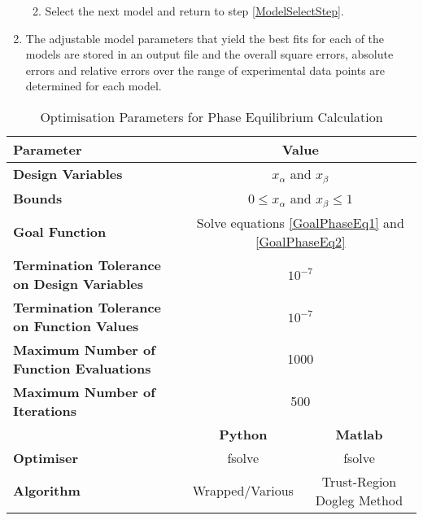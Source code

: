 \begin{enumerate}
\begin{enumerate}
\begin{enumerate}
							\end{enumerate}
						\item Select the next model and return to step \ref{ModelSelectStep}.
						 \end{enumerate}
				\item The adjustable model parameters that yield the best fits for each of the models are stored in an output file and the overall square errors, absolute errors and relative errors over the range of experimental data points are determined for each model.
			\end{enumerate}
				
			\begin{table}
			\begin{tabular*}{\textwidth}{l|cc}
				\hline
				\textbf{Parameter}&\multicolumn{2}{c}{\textbf{Value}}\\
				\hline
				\hline
				\textbf{Design Variables}& \multicolumn{2}{c}{$x_{\alpha}$ and $x_{\beta}$}\\
				\textbf{Bounds}& \multicolumn{2}{c}{$0 \leq x_{\alpha}$ and $x_{\beta} \leq 1 $}\\
				\textbf{Goal Function}& \multicolumn{2}{c}{Solve equations \ref{GoalPhaseEq1} and \ref{GoalPhaseEq2} } \\
				\textbf{Termination Tolerance on Design Variables}& \multicolumn{2}{c}{$10^{-7}$ }\\
				\textbf{Termination Tolerance on Function Values}& \multicolumn{2}{c}{$10^{-7}$}\\
				\textbf{Maximum Number of Function Evaluations}& \multicolumn{2}{c}{1000}\\
				\textbf{Maximum Number of Iterations}& \multicolumn{2}{c}{500}\\				
				\cline{2-3}
				&\textbf{Python}&\textbf{Matlab}\\
				\cline{2-3}
				\textbf{Optimiser }&fsolve&fsolve\\
				\textbf{Algorithm}& Wrapped/Various&Trust-Region Dogleg Method\\
				\hline
				\end{tabular*}\\
			\caption{Optimisation Parameters for Phase Equilibrium Calculation} \label{PhaseEqOptParam}			
			\end{table}		
			
